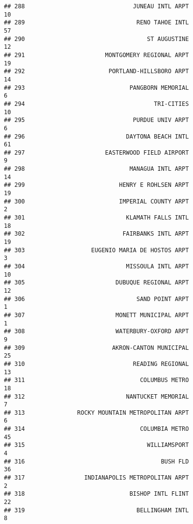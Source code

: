 \documentclass[
]{article}
\begin{document}
\begin{verbatim}
## 288                               JUNEAU INTL ARPT                          10
## 289                                RENO TAHOE INTL                          57
## 290                                   ST AUGUSTINE                          12
## 291                       MONTGOMERY REGIONAL ARPT                          19
## 292                        PORTLAND-HILLSBORO ARPT                          14
## 293                              PANGBORN MEMORIAL                           6
## 294                                     TRI-CITIES                          10
## 295                               PURDUE UNIV ARPT                           6
## 296                             DAYTONA BEACH INTL                          61
## 297                       EASTERWOOD FIELD AIRPORT                           9
## 298                              MANAGUA INTL ARPT                          14
## 299                           HENRY E ROHLSEN ARPT                          19
## 300                           IMPERIAL COUNTY ARPT                           2
## 301                             KLAMATH FALLS INTL                          18
## 302                            FAIRBANKS INTL ARPT                          19
## 303                   EUGENIO MARIA DE HOSTOS ARPT                           3
## 304                             MISSOULA INTL ARPT                          10
## 305                          DUBUQUE REGIONAL ARPT                          12
## 306                                SAND POINT ARPT                           1
## 307                          MONETT MUNICIPAL ARPT                           1
## 308                          WATERBURY-OXFORD ARPT                           9
## 309                         AKRON-CANTON MUNICIPAL                          25
## 310                               READING REGIONAL                          13
## 311                                 COLUMBUS METRO                          18
## 312                             NANTUCKET MEMORIAL                           7
## 313               ROCKY MOUNTAIN METROPOLITAN ARPT                           6
## 314                                 COLUMBIA METRO                          45
## 315                                   WILLIAMSPORT                           4
## 316                                       BUSH FLD                          36
## 317                 INDIANAPOLIS METROPOLITAN ARPT                           2
## 318                              BISHOP INTL FLINT                          22
## 319                                BELLINGHAM INTL                           8

\end{verbatim}
\end{document}
